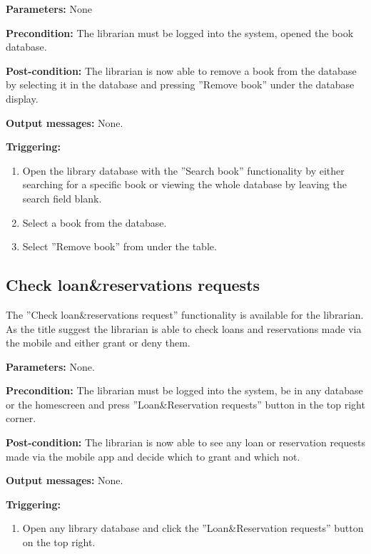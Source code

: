 \begin{description}

\item \textbf{Parameters:} None

\item \textbf{Precondition:} The librarian must be logged into the system,
opened the book database.

\item \textbf{Post-condition:} The librarian is now able to remove a book from
the database by selecting it in the database and pressing ''Remove book''
under the database display.

\item \textbf{Output messages:} None.

\item \textbf{Triggering:}
\begin{enumerate}
\item Open the library database with the ''Search book'' functionality by
either searching for a specific book or viewing the whole database by leaving
the search field blank.
\item Select a book from the database.
\item Select ''Remove book'' from under the table.
\end{enumerate}

\end{description}

\subsection{Check loan&reservations requests}

The ''Check loan&reservations request'' functionality is available for the
librarian.
As the title suggest the librarian is able to check loans and reservations made
via the mobile and either grant or deny them.

\begin{description}

\item \textbf{Parameters:} None.

\item \textbf{Precondition:} The librarian must be logged into the system, be in
any database or the homescreen and press ''Loan&Reservation requests'' button in
the top right corner.

\item \textbf{Post-condition:} The librarian is now able to see any loan or
reservation requests made via the mobile app and decide which to grant and which
not.

\item \textbf{Output messages:} None.

\item \textbf{Triggering:}
\begin{enumerate}
\item Open any library database and click the ''Loan&Reservation requests''
button on the top right.
\end{enumerate}

\end{description}

